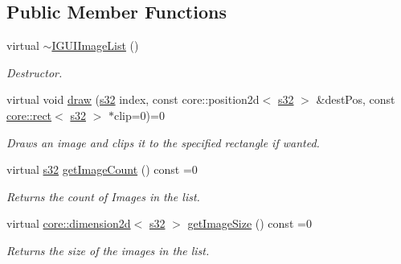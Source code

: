 \subsection*{Public Member Functions}
\begin{DoxyCompactItemize}
\item 
\mbox{\label{classirr_1_1gui_1_1IGUIImageList_ad6be754893f7ba902d821d215761075f}} 
virtual \hyperlink{classirr_1_1gui_1_1IGUIImageList_ad6be754893f7ba902d821d215761075f}{$\sim$\+I\+G\+U\+I\+Image\+List} ()
\begin{DoxyCompactList}\small\item\em Destructor. \end{DoxyCompactList}\item 
virtual void \hyperlink{classirr_1_1gui_1_1IGUIImageList_ae19fa00cece01c5914dfc0a3e33a882c}{draw} (\hyperlink{namespaceirr_ac66849b7a6ed16e30ebede579f9b47c6}{s32} index, const core\+::position2d$<$ \hyperlink{namespaceirr_ac66849b7a6ed16e30ebede579f9b47c6}{s32} $>$ \&dest\+Pos, const \hyperlink{classirr_1_1core_1_1rect}{core\+::rect}$<$ \hyperlink{namespaceirr_ac66849b7a6ed16e30ebede579f9b47c6}{s32} $>$ $\ast$clip=0)=0
\begin{DoxyCompactList}\small\item\em Draws an image and clips it to the specified rectangle if wanted. \end{DoxyCompactList}\item 
virtual \hyperlink{namespaceirr_ac66849b7a6ed16e30ebede579f9b47c6}{s32} \hyperlink{classirr_1_1gui_1_1IGUIImageList_a1cc8626cacd608f343d103394423753e}{get\+Image\+Count} () const =0
\begin{DoxyCompactList}\small\item\em Returns the count of Images in the list. \end{DoxyCompactList}\item 
virtual \hyperlink{classirr_1_1core_1_1dimension2d}{core\+::dimension2d}$<$ \hyperlink{namespaceirr_ac66849b7a6ed16e30ebede579f9b47c6}{s32} $>$ \hyperlink{classirr_1_1gui_1_1IGUIImageList_a5973353355625da76b24100f16f90539}{get\+Image\+Size} () const =0
\begin{DoxyCompactList}\small\item\em Returns the size of the images in the list. \end{DoxyCompactList}\item 
\mbox{\label{classirr_1_1gui_1_1IGUIImageList_ad6be754893f7ba902d821d215761075f}} 

\end{DoxyCompactItemize}
